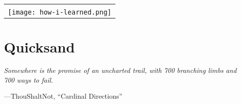 \documentclass[12pt]{cmuthesis}
\begin{document}
\cleardoublepage
\pagestyle{empty}
\begin{center}
\begin{tabular}{c}
\vspace{12em} \\
\texttt{[image: how-i-learned.png]}
\end{tabular}
\end{center}

\mainmatter


%
%
%
%
%

\newcommand\simics{\textsc{Simics}}
\newcommand{\sect}[1]{\S #1}
\newcommand\hilight[2]{\color{#1}#2\color{black}}

\newtheorem{theorem}{Theorem}

\newcommand\llama[1]{\texttt{[image: llama.pdf]}}
\newcommand\llitem{\item[\llama{1.2em}]}

\newcommand{\inspirationallinebreak}{\vspace{0.25em}}
\newcommand\inspirationalquote[2]{\begin{flushright}
	\vspace{-1em}
	\fontfamily{pzc}\selectfont
	{\em #1}
	\inspirationallinebreak

	---{#2}
	\fontfamily{mdbch}\selectfont
	\vspace{2em}
\end{flushright}}




\chapter{Quicksand}
\inspirationalquote{Somewhere is the promise of an uncharted trail, with 700 branching limbs and 700 ways to fail.}
{ThouShaltNot, ``Cardinal Directions''}
\end{document}
